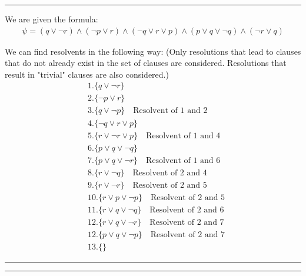 \documentclass[12pt,letterpaper, onecolumn]{exam}
\begin{document}
\begin{questions}
    {\rule{17cm}{0.4pt}}
	\question[]
	\solutiontitle

	We are given the formula:
	\begin{align*}
		\psi = (q \lor \neg r) \land (\neg p \lor r) \land (\neg q \lor r \lor p) \land (p \lor q \lor \neg q) \land (\neg r \lor q)
	\end{align*}

	We can find resolvents in the following way:
	(Only resolutions that lead to clauses that do not already exist in the set of clauses are considered. 
	Resolutions that result in "trivial" clauses are also considered.)
	\begin{align*}
		& 1. \{ q \lor \neg r \} \\
		& 2. \{ \neg p \lor r \} \\
		& 3. \{ q \lor \neg p \} \quad \text{Resolvent of 1 and 2} \\
		& 4. \{ \neg q \lor r \lor p \} \\
		& 5. \{ r \lor \neg r \lor p \} \quad \text{Resolvent of 1 and 4} \\
		& 6. \{ p \lor q \lor \neg q \} \\
		& 7. \{ p \lor q \lor \neg r \} \quad \text{Resolvent of 1 and 6} \\
		& 8. \{ r \lor \neg q \} \quad \text{Resolvent of 2 and 4} \\
		& 9. \{ r \lor \neg r \} \quad \text{Resolvent of 2 and 5} \\
		& 10. \{ r \lor p \lor \neg p \} \quad \text{Resolvent of 2 and 5} \\
		& 11. \{ r \lor q \lor \neg q \} \quad \text{Resolvent of 2 and 6} \\
		& 12. \{ r \lor q \lor \neg r \} \quad \text{Resolvent of 2 and 7} \\
		& 12. \{ p \lor q \lor \neg p \} \quad \text{Resolvent of 2 and 7} \\
		& 13. \{  \}
	\end{align*}

    {\rule{17cm}{0.4pt}}
	\question[]
	\solutiontitle

    {\rule{17cm}{0.4pt}}

\end{questions}
\end{document}
